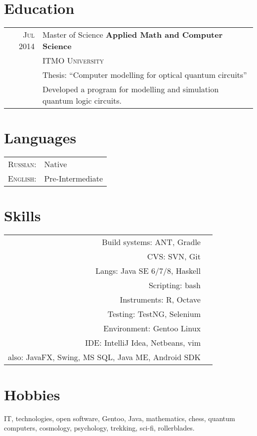 \documentclass[a4paper,11pt]{article}
\begin{document}
\section{Education}
	\begin{tabular}{rl}	
	  \textsc{Jul 2014} & Master of Science \textbf{ Applied Math and Computer Science} \\& \textsc{ITMO University}\\
			& Thesis: ``Computer modelling for optical quantum circuits''\\&
			Developed a program for modelling and simulation quantum logic circuits.
	\end{tabular}

\section{Languages}
	\begin{tabular}{rl}
		\textsc{Russian:}&Native\\
		\textsc{English:}&Pre-Intermediate\\
	\end{tabular}

\section{Skills}
	\begin{tabular}{rl}
		Build systems: ANT, Gradle \\
		CVS: SVN, Git \\
		Langs: Java SE 6/7/8, Haskell \\
		Scripting: bash \\ 
		Instruments: R, Octave \\
		Testing: TestNG, Selenium \\
		Environment: Gentoo Linux \\
		IDE: IntelliJ Idea, Netbeans, vim \\
		also: JavaFX, Swing, MS SQL, Java ME, Android SDK
	\end{tabular}

\section{Hobbies}
	IT, technologies, open software, Gentoo, Java, mathematics, chess, quantum computers, cosmology,
	psychology, trekking, sci-fi, rollerblades. 
\end{document}
